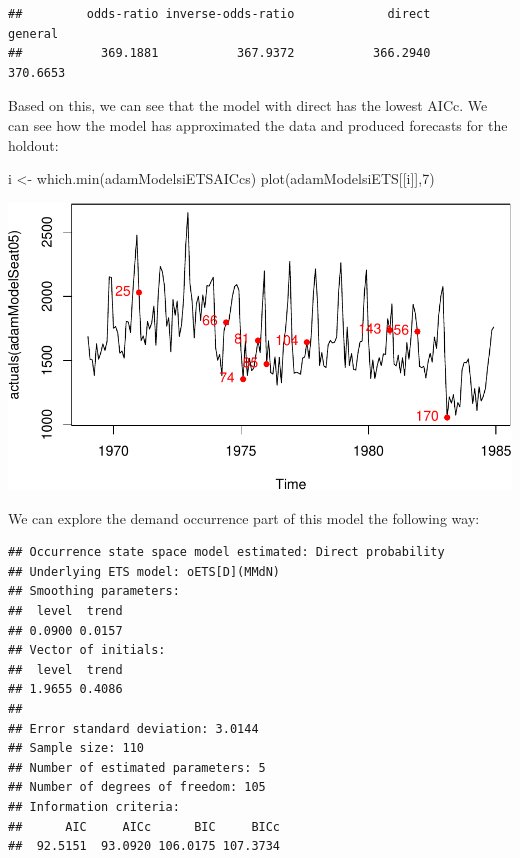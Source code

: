 \documentclass[
]{book}
\newenvironment{Shaded}{\begin{snugshade}}{\end{snugshade}}
\newcommand{\DecValTok}[1]{\textcolor[rgb]{0.00,0.00,0.81}{#1}}
\newcommand{\FunctionTok}[1]{\textcolor[rgb]{0.00,0.00,0.00}{#1}}
\newcommand{\NormalTok}[1]{#1}
\newcommand{\OtherTok}[1]{\textcolor[rgb]{0.56,0.35,0.01}{#1}}
\newcommand{\SpecialCharTok}[1]{\textcolor[rgb]{0.00,0.00,0.00}{#1}}
\theoremstyle{definition}
\theoremstyle{definition}
\theoremstyle{definition}
\theoremstyle{definition}
\theoremstyle{remark}
\begin{document}
\begin{verbatim}
##         odds-ratio inverse-odds-ratio             direct            general 
##           369.1881           367.9372           366.2940           370.6653
\end{verbatim}

Based on this, we can see that the model with direct has the lowest AICc. We can see how the model has approximated the data and produced forecasts for the holdout:

\begin{Shaded}
\begin{Highlighting}[]
\NormalTok{i }\OtherTok{\textless{}{-}} \FunctionTok{which.min}\NormalTok{(adamModelsiETSAICcs)}
\FunctionTok{plot}\NormalTok{(adamModelsiETS[[i]],}\DecValTok{7}\NormalTok{)}
\end{Highlighting}
\end{Shaded}

\includegraphics{adam_files/figure-latex/unnamed-chunk-117-1.pdf}

We can explore the demand occurrence part of this model the following way:

\begin{Shaded}
\end{Shaded}

\begin{verbatim}
## Occurrence state space model estimated: Direct probability
## Underlying ETS model: oETS[D](MMdN)
## Smoothing parameters:
##  level  trend 
## 0.0900 0.0157 
## Vector of initials:
##  level  trend 
## 1.9655 0.4086 
## 
## Error standard deviation: 3.0144
## Sample size: 110
## Number of estimated parameters: 5
## Number of degrees of freedom: 105
## Information criteria: 
##      AIC     AICc      BIC     BICc 
##  92.5151  93.0920 106.0175 107.3734
\end{verbatim}
\end{document}
